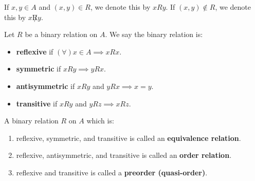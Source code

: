 


\vspace{1em}
If $x, y \in A$ and $(x, y) \in R$, we denote this by $x R y$. If $(x, y) \notin R$, we denote this by $x \not R y$.

\begin{definition}
Let $R$ be a binary relation on $A$. We say the binary relation is:
\begin{itemize}
    \item \textbf{reflexive} if $(\forall) x \in A \implies x R x$.
    \item \textbf{symmetric} if $x R y \implies y R x$.
    \item \textbf{antisymmetric} if $x R y$ and $y R x \implies x = y$.
    \item \textbf{transitive} if $x R y$ and $y R z \implies x R z$.
\end{itemize}
\end{definition}

\begin{definition}
A binary relation $R$ on $A$ which is:
\begin{enumerate}
    \item reflexive, symmetric, and transitive is called an \textbf{equivalence relation}.
    \item reflexive, antisymmetric, and transitive is called an \textbf{order relation}.
    \item reflexive and transitive is called a \textbf{preorder (quasi-order)}.
\end{enumerate}
\end{definition}

